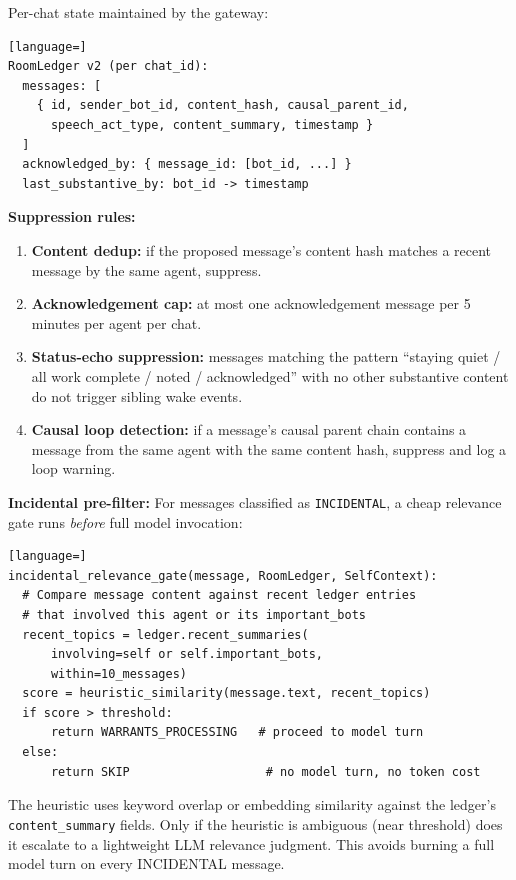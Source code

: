 \documentclass[11pt]{article}
\begin{document}
Per-chat state maintained by the gateway:

\begin{lstlisting}[language=]
RoomLedger v2 (per chat_id):
  messages: [
    { id, sender_bot_id, content_hash, causal_parent_id,
      speech_act_type, content_summary, timestamp }
  ]
  acknowledged_by: { message_id: [bot_id, ...] }
  last_substantive_by: bot_id -> timestamp
\end{lstlisting}

\textbf{Suppression rules:}
\begin{enumerate}
\item \textbf{Content dedup:} if the proposed message's content hash matches a
recent message by the same agent, suppress.
\item \textbf{Acknowledgement cap:} at most one acknowledgement message per 5
minutes per agent per chat.
\item \textbf{Status-echo suppression:} messages matching the pattern ``staying
quiet / all work complete / noted / acknowledged'' with no other substantive
content do not trigger sibling wake events.
\item \textbf{Causal loop detection:} if a message's causal parent chain
contains a message from the same agent with the same content hash, suppress
and log a loop warning.
\end{enumerate}

\textbf{Incidental pre-filter:} For messages classified as \texttt{INCIDENTAL},
a cheap relevance gate runs \emph{before} full model invocation:

\begin{lstlisting}[language=]
incidental_relevance_gate(message, RoomLedger, SelfContext):
  # Compare message content against recent ledger entries
  # that involved this agent or its important_bots
  recent_topics = ledger.recent_summaries(
      involving=self or self.important_bots,
      within=10_messages)
  score = heuristic_similarity(message.text, recent_topics)
  if score > threshold:
      return WARRANTS_PROCESSING   # proceed to model turn
  else:
      return SKIP                   # no model turn, no token cost
\end{lstlisting}

The heuristic uses keyword overlap or embedding similarity against the
ledger's \texttt{content\_summary} fields.  Only if the heuristic is ambiguous
(near threshold) does it escalate to a lightweight LLM relevance judgment.
This avoids burning a full model turn on every INCIDENTAL message.
\end{document}
